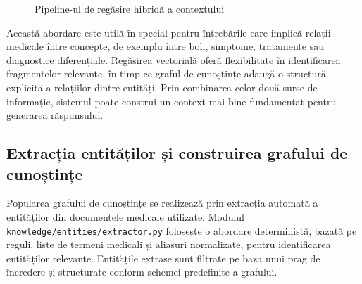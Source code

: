 \documentclass[12pt, a4paper, oneside, romanian]{teza-upb}
\begin{document}
\begin{figure}[H]
\centering
{}
\caption{Pipeline-ul de regăsire hibridă a contextului}
\label{fig:rag-retrieval}
\end{figure}

Această abordare este utilă în special pentru întrebările care implică relații medicale între concepte, de exemplu între boli, simptome, tratamente sau diagnostice diferențiale. Regăsirea vectorială oferă flexibilitate în identificarea fragmentelor relevante, în timp ce graful de cunoștințe adaugă o structură explicită a relațiilor dintre entități. Prin combinarea celor două surse de informație, sistemul poate construi un context mai bine fundamentat pentru generarea răspunsului.

\subsection{Extracția entităților și construirea grafului de cunoștințe}

Popularea grafului de cunoștințe se realizează prin extracția automată a entităților din documentele medicale utilizate. Modulul \texttt{knowledge/entities/extractor.py} folosește o abordare deterministă, bazată pe reguli, liste de termeni medicali și aliasuri normalizate, pentru identificarea entităților relevante. Entitățile extrase sunt filtrate pe baza unui prag de încredere și structurate conform schemei predefinite a grafului.
\end{document}

